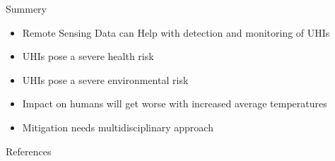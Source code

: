 \documentclass[final,20pt]{beamer}
\newlength{\sepwidth}
\newlength{\colwidth}
\newcommand{\separatorcolumn}{\begin{column}{\sepwidth}\end{column}}
\begin{document}
\begin{frame}[t]
\begin{columns}[t]
\begin{column}{\colwidth}

  \begin{alertblock}{Summery}
    \begin{itemize}
      \setlength\itemsep{.2em}
      \item Remote Sensing Data can Help with detection and monitoring of UHIs
      \item UHIs pose a severe health risk
      \item UHIs pose a severe environmental risk
      \item Impact on humans will get worse with increased average temperatures
      \item Mitigation needs multidisciplinary approach
    \end{itemize}
  \end{alertblock}

  \vspace{-2em}
  \begin{block}{References}
    \nocite{*}
    \footnotesize{\printbibliography}
  \end{block}

\end{column}

\separatorcolumn%
\end{columns}
\end{frame}
\end{document}
